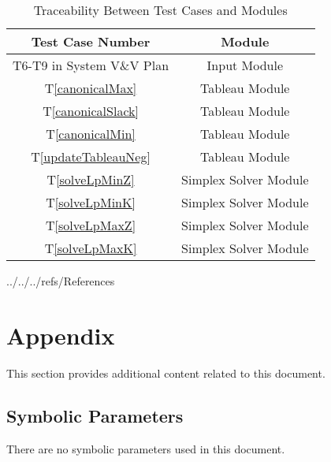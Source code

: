 \documentclass[12pt, titlepage]{article}
\newcommand{\tref}[1]{T\ref{#1}}
\begin{document}
\begin{table} [h!]
	\centering
	\begin{tabular}{|c|c|}
		\hline	
		\textbf{Test Case Number} & \textbf{Module}\\
		\hline 
		T6-T9 in System V\&V Plan& Input Module\\ \hline
		\tref{canonicalMax}& Tableau Module\\ \hline
		\tref{canonicalSlack}& Tableau Module\\ \hline
		\tref{canonicalMin}& Tableau Module\\ \hline
		\tref{updateTableauNeg}& Tableau Module\\ \hline
		\tref{solveLpMinZ}& Simplex Solver Module\\ \hline
		\tref{solveLpMinK}& Simplex Solver Module\\ \hline
		\tref{solveLpMaxZ}& Simplex Solver Module\\ \hline
		\tref{solveLpMaxK}& Simplex Solver Module\\ \hline
	\end{tabular}
	\caption{Traceability Between Test Cases and Modules}
	\label{Table:Traceability} 
\end{table}

\newpage


 {../../../refs/References}

\newpage

\section{Appendix}

This section provides additional content related to this document.

\subsection{Symbolic Parameters}

There are no symbolic parameters used in this document.
\end{document}
